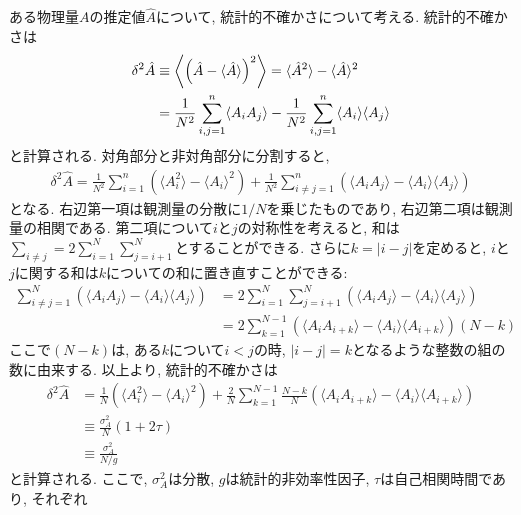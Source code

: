 ある物理量$A$の推定値$\hat{A}$について, 統計的不確かさについて考える. 
統計的不確かさは
\begin{align}
    \delta^{2} \hat{A} &\equiv
    \left\langle \left( \hat{A} - \langle \hat{A}\rangle \right)^{2} \right\rangle
    = \langle \hat{A}^{2} \rangle - \langle \hat{A} \rangle^{2}
    \notag \\ &=
    \frac{1}{N^{2}} \sum_{i,j=1}^{n} \langle A_{i} A_{j} \rangle -
    \frac{1}{N^{2}} \sum_{i,j=1}^{n} \langle A_{i} \rangle \langle A_{j} \rangle
\end{align}
と計算される. 
対角部分と非対角部分に分割すると, 
\begin{align}
    \delta^{2} \hat{A} =
    \frac{1}{N^{2}} \sum_{i=1}^{n}
    \left(\langle A_{i}^{2} \rangle - \langle A_{i}\rangle^{2} \right) +
    \frac{1}{N^{2}} \sum_{i \neq j = 1}^{n}
    \left(\langle A_{i}A_{j} \rangle - \langle A_{i}\rangle \langle A_{j}\rangle \right)
\end{align}
となる. 右辺第一項は観測量の分散に$1/N$を乗じたものであり, 右辺第二項は観測量の相関である. 
第二項について$i$と$j$の対称性を考えると, 和は$\sum_{i \neq j} = 2\sum_{i=1}^{N} \sum_{j=i+1}^{N}$とすることができる. さらに$k=|i-j|$を定めると, $i$と$j$に関する和は$k$についての和に置き直すことができる:
\begin{align}
    \sum_{i \neq j = 1}^{N}
    \left(\langle A_{i}A_{j} \rangle - \langle A_{i}\rangle \langle A_{j}\rangle \right)
    &=
    2\sum_{i=1}^{N} \sum_{j=i+1}^{N}
    \left(\langle A_{i}A_{j} \rangle - \langle A_{i}\rangle \langle A_{j}\rangle \right)
    \\
    &=
    2\sum_{k=1}^{N-1}
    \left(
        \langle A_{i}A_{i+k} \rangle - \langle A_{i}\rangle \langle A_{i+k}\rangle
    \right)
    \left( N - k \right)
\end{align}
ここで$(N-k)$は, ある$k$について$i<j$の時, $|i-j| = k$となるような整数の組の数に由来する. 
以上より, 統計的不確かさは
\begin{align}
    \delta^{2} \hat{A} &=
    \frac{1}{N}
    \left(\langle A_{i}^{2} \rangle - \langle A_{i}\rangle^{2} \right) +
    \frac{2}{N} \sum_{k=1}^{N-1}
    \frac{N-k}{N}
    \left(
        \langle A_{i}A_{i+k} \rangle - \langle A_{i}\rangle \langle A_{i+k}\rangle
    \right)
    \\
    &\equiv
    \frac{\sigma_{A}^{2}}{N} (1+2\tau)
    \\
    &\equiv
    \frac{\sigma_{A}^{2}}{N/g}
    \label{Eq:Statistical-Uncertainty-A}
\end{align}
と計算される. ここで, $\sigma_{A}^{2}$は分散, $g$は統計的非効率性因子, $\tau$は自己相関時間であり, それぞれ
